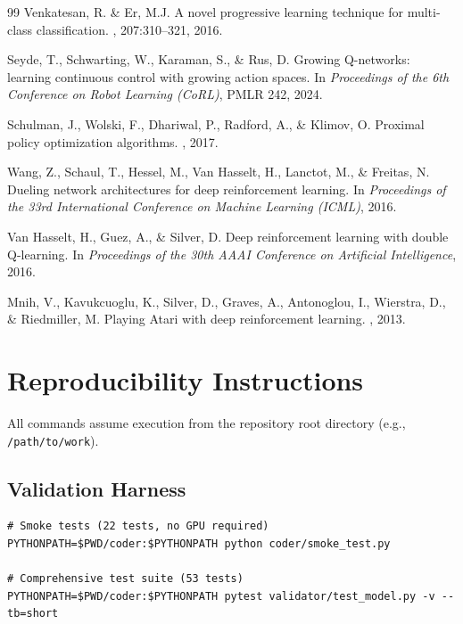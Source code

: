 \documentclass{article}
\begin{document}
{\begin{thebibliography}{99}
Venkatesan, R. \& Er, M.J.
\newblock A novel progressive learning technique for multi-class
classification.
, 207:310--321, 2016.

Seyde, T., Schwarting, W., Karaman, S., \& Rus, D.
\newblock Growing Q-networks: learning continuous control with growing action
spaces.
\newblock In {\it Proceedings of the 6th Conference on Robot Learning (CoRL)},
  PMLR 242, 2024.

Schulman, J., Wolski, F., Dhariwal, P., Radford, A., \& Klimov, O.
\newblock Proximal policy optimization algorithms.
, 2017.

Wang, Z., Schaul, T., Hessel, M., Van Hasselt, H., Lanctot, M., \&
  Freitas, N.
\newblock Dueling network architectures for deep reinforcement learning.
\newblock In {\it Proceedings of the 33rd International Conference on Machine
  Learning (ICML)}, 2016.

Van Hasselt, H., Guez, A., \& Silver, D.
\newblock Deep reinforcement learning with double Q-learning.
\newblock In {\it Proceedings of the 30th AAAI Conference on Artificial
  Intelligence}, 2016.

Mnih, V., Kavukcuoglu, K., Silver, D., Graves, A., Antonoglou, I.,
  Wierstra, D., \& Riedmiller, M.
\newblock Playing Atari with deep reinforcement learning.
, 2013.

\end{thebibliography}
}


\appendix
\section{Reproducibility Instructions}

All commands assume execution from the repository root directory
(e.g., \texttt{/path/to/work}).

\subsection{Validation Harness}
\begin{verbatim}
# Smoke tests (22 tests, no GPU required)
PYTHONPATH=$PWD/coder:$PYTHONPATH python coder/smoke_test.py

# Comprehensive test suite (53 tests)
PYTHONPATH=$PWD/coder:$PYTHONPATH pytest validator/test_model.py -v --tb=short
\end{verbatim}
\end{document}

